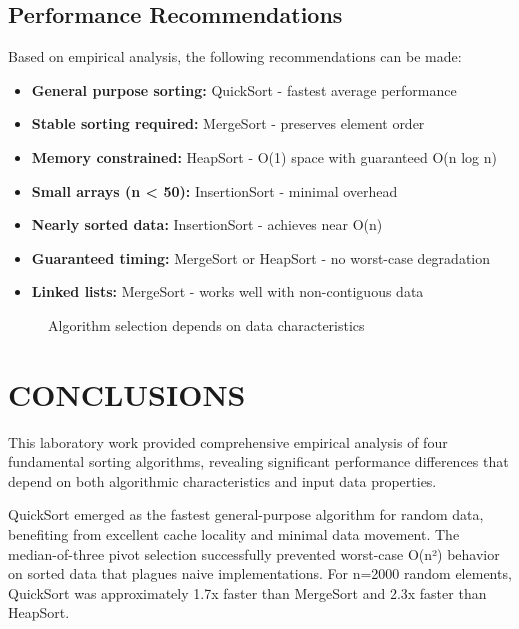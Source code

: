 \documentclass[12pt]{article}
\begin{document}
\subsection{Performance Recommendations}

Based on empirical analysis, the following recommendations can be made:

\begin{itemize}
    \item \textbf{General purpose sorting:} QuickSort - fastest average performance
    \item \textbf{Stable sorting required:} MergeSort - preserves element order
    \item \textbf{Memory constrained:} HeapSort - O(1) space with guaranteed O(n log n)
    \item \textbf{Small arrays (n < 50):} InsertionSort - minimal overhead
    \item \textbf{Nearly sorted data:} InsertionSort - achieves near O(n)
    \item \textbf{Guaranteed timing:} MergeSort or HeapSort - no worst-case degradation
    \item \textbf{Linked lists:} MergeSort - works well with non-contiguous data
\end{itemize}

\begin{figure}[H]
    \centering
    \caption{Algorithm selection depends on data characteristics}
    \label{fig:final_comparison}
\end{figure}

\clearpage
\section{CONCLUSIONS}

\hspace{0.8cm} This laboratory work provided comprehensive empirical analysis of four fundamental sorting algorithms, revealing significant performance differences that depend on both algorithmic characteristics and input data properties.

QuickSort emerged as the fastest general-purpose algorithm for random data, benefiting from excellent cache locality and minimal data movement. The median-of-three pivot selection successfully prevented worst-case O(n²) behavior on sorted data that plagues naive implementations. For n=2000 random elements, QuickSort was approximately 1.7x faster than MergeSort and 2.3x faster than HeapSort.
\end{document}
